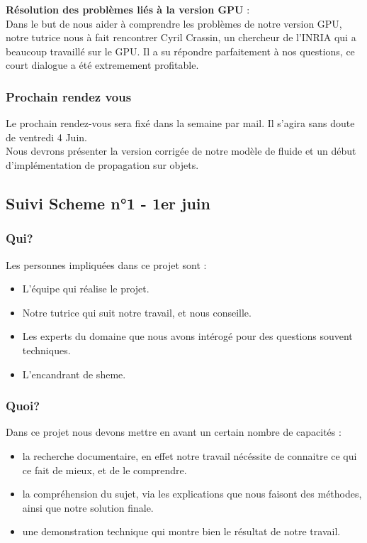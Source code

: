 \documentclass[a4paper,10pt]{article}
\begin{document}
\textbf{Résolution des problèmes liés à la version GPU} :  \\
    Dans le but de nous aider à comprendre les problèmes de notre version GPU, 
    notre tutrice nous à fait rencontrer Cyril Crassin, un chercheur de l'INRIA qui
    a beaucoup travaillé sur le GPU. Il a su répondre parfaitement à nos questions,
    ce court dialogue a été extremement profitable. \\

\subsubsection{Prochain rendez vous}
Le prochain rendez-vous sera fixé dans la semaine par mail. Il s'agira sans doute de ventredi 4 Juin.\\
Nous devrons présenter la version corrigée de notre modèle de fluide et un début d'implémentation de propagation
sur objets.\\

\subsection{Suivi Scheme n°1 - 1er juin}
\subsubsection{Qui?}
Les personnes impliquées dans ce projet sont :
\begin{itemize}
\item L'équipe qui réalise le projet.
\item Notre tutrice qui suit notre travail, et nous conseille.
\item Les experts du domaine que nous avons intérogé pour des questions souvent techniques.
\item L'encandrant de sheme.
\end{itemize}

\subsubsection{Quoi?}
Dans ce projet nous devons mettre en avant un certain nombre de capacités :
\begin{itemize}
\item la recherche documentaire, en effet notre travail nécéssite de
  connaitre ce qui ce fait de mieux, et de le comprendre.
\item la compréhension du sujet, via les explications que nous faisont
  des méthodes, ainsi que notre solution finale.
\item une demonstration technique qui montre bien le résultat de notre
  travail.
\end{itemize}
\end{document}
